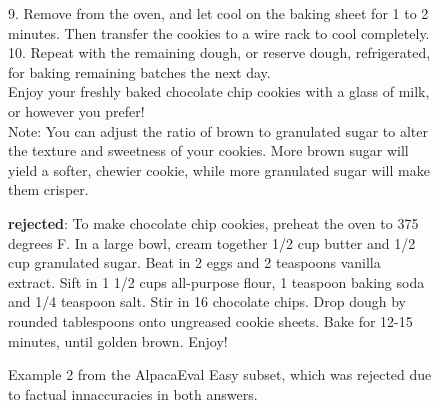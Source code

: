 \begin{figure}[t]
{\begin{minipage}{0.95\linewidth}
9. Remove from the oven, and let cool on the baking sheet for 1 to 2 minutes. Then transfer the cookies to a wire rack to cool completely. \\
10. Repeat with the remaining dough, or reserve dough, refrigerated, for baking remaining batches the next day. \\
Enjoy your freshly baked chocolate chip cookies with a glass of milk, or however you prefer! \\
Note: You can adjust the ratio of brown to granulated sugar to alter the texture and sweetness of your cookies. More brown sugar will yield a softer, chewier cookie, while more granulated sugar will make them crisper. \\


\vspace{1em}

\textbf{rejected}: To make chocolate chip cookies, preheat the oven to 375 degrees F. In a large bowl, cream together 1/2 cup butter and 1/2 cup granulated sugar. Beat in 2 eggs and 2 teaspoons vanilla extract. Sift in 1 1/2 cups all-purpose flour, 1 teaspoon baking soda and 1/4 teaspoon salt. Stir in 16 chocolate chips. Drop dough by rounded tablespoons onto ungreased cookie sheets. Bake for 12-15 minutes, until golden brown. Enjoy!
\end{minipage}
}
\caption{Example 2 from the AlpacaEval Easy subset, which was rejected due to factual innaccuracies in both answers.}
\label{fig:alpacaeval_2}
\end{figure}
